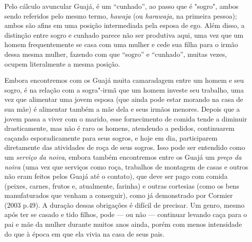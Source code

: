 Pelo cálculo avuncular Guajá,  é um ``cunhado'', ao passo que  é
"sogro", ambos sendo referidos pelo mesmo termo, \emph{hawaja} (ou
\emph{harawaja,} na primeira pessoa); ambos são afins em uma posição
intermediada pela esposa de ego. Além disso, a distinção entre sogro e
cunhado parece não ser produtiva aqui, uma vez que um homem
frequentemente se casa com uma mulher e cede sua filha para o irmão
dessa mesma mulher, fazendo com que ``sogro'' e ``cunhado'', muitas vezes,
ocupem literalmente a mesma posição.

Embora encontremos com os Guajá muita camaradagem entre um homem e seu
sogro, é na relação com a sogra"-irmã que um homem investe seu trabalho,
uma vez que alimentar uma jovem esposa (que ainda pode estar morando na
casa de sua mãe) é alimentar também a mãe dela e seus irmãos menores.
Depois que a jovem passa a viver com o marido, esse fornecimento de
comida tende a diminuir drasticamente, mas não é raro os homens,
atendendo a pedidos, continuarem caçando esporadicamente para seus
sogros, e hoje em dia, participarem diretamente das atividades de roça
de seus sogros. Isso pode ser entendido como um \emph{serviço da noiva},
embora também encontremos entre os Guajá um \emph{preço da noiva} (uma
vez que serviços como roça, trabalhos de montagem de casas e outros não
eram feitos pelos Guajá até o contato), que deve ser pago com comida
(peixes, carnes, frutos e, atualmente, farinha) e outras cortesias (como
os bens manufaturados que venham a conseguir), como já demonstrado por
Cormier (2003 p.49). A duração dessas obrigações é difícil de precisar.
Um genro, mesmo após ter se casado e tido filhos, pode --- ou não ---
continuar levando caça para o pai e mãe da mulher durante muitos anos
ainda, porém com menos intensidade do que à época em que ela vivia na
casa de seus pais.

